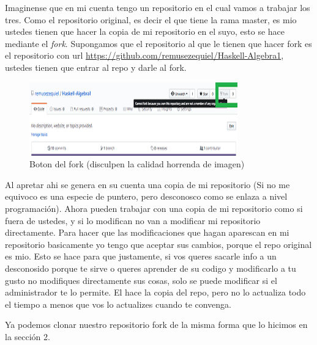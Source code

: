 \documentclass[10pt,journal,compsoc]{IEEEtran}
\begin{document}
Imaginense que en mi cuenta tengo un repositorio en el cual vamos a trabajar los tres. Como el repositorio original, es decir el que tiene la rama master, es mio ustedes tienen que hacer la copia de mi repositorio en el suyo, esto se hace mediante el \textit{fork}. Supongamos que el repositorio al que le tienen que hacer fork es el repositorio con url \url{https://github.com/remusezequiel/Haskell-Algebra1}, ustedes tienen que entrar al repo y darle al fork.
\begin{figure}[H]
  \begin{center}
	 \includegraphics{figuras/fork.png}
	 \centering
	 \renewcommand{\arraystretch}{1.3}
	 \caption{Boton del fork (disculpen la calidad horrenda de imagen)}
  \end{center}
\end{figure} 
Al apretar ahi se genera en su cuenta una copia de mi repositorio (Si no me equivoco es una especie de puntero, pero desconosco como se enlaza a nivel programación). Ahora pueden trabajar con una copia de mi repositorio como si fuera de ustedes, y si lo modifican no van a modificar mi repositorio directamente. Para hacer que las modificaciones que hagan aparescan en mi repositorio basicamente yo tengo que aceptar sus cambios, porque el repo original es mio. Esto se hace para que justamente, si vos queres sacarle info a un desconosido porque te sirve o queres aprender de su codigo y modificarlo a tu gusto no modifiques directamente sus cosas, solo se puede modificar si el administrador te lo permite. El hace la copia del repo, pero no lo actualiza todo el tiempo a menos que vos lo actualizes cuando te convenga. 

Ya podemos clonar nuestro repositorio fork de la misma forma que lo hicimos en la sección 2.
\end{document}
